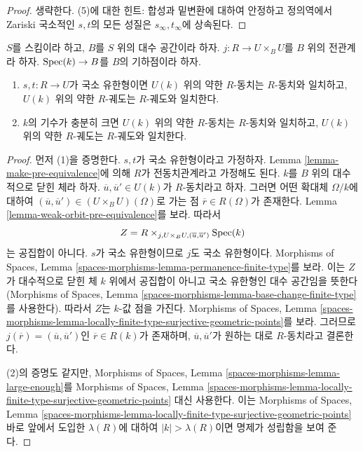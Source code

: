 \begin{proof}
생략한다. (5)에 대한 힌트: 합성과 밑변환에 대하여 안정하고
정의역에서 Zariski 국소적인 $s, t$의 모든 성질은
$s_\infty, t_\infty$에 상속된다.
\end{proof}

\begin{lemma}
\label{lemma-geometric-orbits}
$S$를 스킴이라 하고, $B$를 $S$ 위의 대수 공간이라 하자.
$j : R \to U \times_B U$를 $B$ 위의 전관계라 하자.
$\mathop{\mathrm{Spec}}(k) \to B$를 $B$의 기하점이라 하자.
\begin{enumerate}
\item $s, t : R \to U$가 국소 유한형이면 $U(k)$ 위의 약한
$R$-동치는 $R$-동치와 일치하고, $U(k)$ 위의 약한 $R$-궤도는
$R$-궤도와 일치한다.
\item $k$의 기수가 충분히 크면 $U(k)$ 위의 약한 $R$-동치는
$R$-동치와 일치하고, $U(k)$ 위의 약한 $R$-궤도는
$R$-궤도와 일치한다.
\end{enumerate}
\end{lemma}

\begin{proof}
먼저 (1)을 증명한다. $s, t$가 국소 유한형이라고 가정하자.
Lemma \ref{lemma-make-pre-equivalence}에 의해 $R$가
전동치관계라고 가정해도 된다. $k$를 $B$ 위의 대수적으로 닫힌
체라 하자. $\overline{u}, \overline{u}' \in U(k)$가
$R$-동치라고 하자. 그러면 어떤 확대체 $\Omega/k$에 대하여
$(\overline{u}, \overline{u}') \in (U \times_B U)(\Omega)$로
가는 점 $\overline{r} \in R(\Omega)$가 존재한다. Lemma
\ref{lemma-weak-orbit-pre-equivalence}를 보라. 따라서
$$
Z = R \times_{j, U \times_B U, (\overline{u}, \overline{u}')} \mathop{\mathrm{Spec}}(k)
$$
는 공집합이 아니다. $s$가 국소 유한형이므로 $j$도 국소 유한형이다.
Morphisms of Spaces, Lemma
\ref{spaces-morphisms-lemma-permanence-finite-type}를 보라.
이는 $Z$가 대수적으로 닫힌 체 $k$ 위에서 공집합이 아니고
국소 유한형인 대수 공간임을 뜻한다(Morphisms of Spaces, Lemma
\ref{spaces-morphisms-lemma-base-change-finite-type}를 사용한다).
따라서 $Z$는 $k$-값 점을 가진다. Morphisms of Spaces, Lemma
\ref{spaces-morphisms-lemma-locally-finite-type-surjective-geometric-points}를
보라. 그러므로
$j(\overline{r}) = (\overline{u}, \overline{u}')$인
$\overline{r} \in R(k)$가 존재하며,
$\overline{u}, \overline{u}'$가 원하는 대로 $R$-동치라고 결론한다.

\medskip\noindent
(2)의 증명도 같지만, Morphisms of Spaces, Lemma
\ref{spaces-morphisms-lemma-large-enough}를
Morphisms of Spaces, Lemma
\ref{spaces-morphisms-lemma-locally-finite-type-surjective-geometric-points}
대신 사용한다.
이는 Morphisms of Spaces, Lemma
\ref{spaces-morphisms-lemma-locally-finite-type-surjective-geometric-points}
바로 앞에서 도입한 $\lambda(R)$에 대하여
$|k| > \lambda(R)$이면 명제가 성립함을 보여 준다.
\end{proof}

